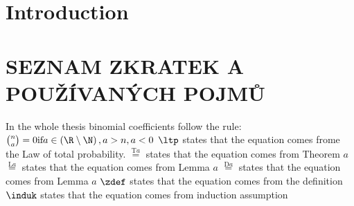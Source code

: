 \chapter*{Introduction}
\chapter*{SEZNAM ZKRATEK A POUŽÍVANÝCH POJMŮ}
In the whole thesis binomial coefficients follow the rule: $\binom{n}{a}=0 \text{if} a\in \left(\R \setminus \N \right), a>n, a<0$
$\ltp$ states that the equation comes frome the Law of total probability.
$\overset{\text{T}a}{=}$ states that the equation comes from Theorem $a$
$\overset{\text{L}a}{=}$ states that the equation comes from Lemma $a$
$\overset{\text{D}a}{=}$ states that the equation comes from Lemma $a$
$\zdef$ states that the equation comes from the definition
$\induk$ states that the equation comes from induction assumption
